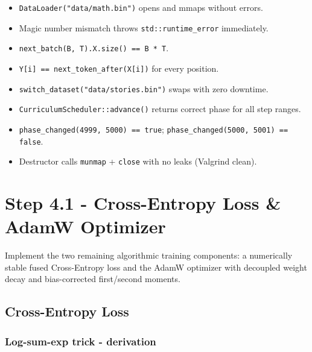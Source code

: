 \documentclass[12pt, a4paper]{article}
\begin{document}
\begin{tcolorbox}[exitbox, title={Steps 3.2 \& 3.3 - Exit Criterion (met)}]
  \begin{itemize}
    \item \texttt{DataLoader("data/math.bin")} opens and mmaps without errors. \checkmark
    \item Magic number mismatch throws \texttt{std::runtime\_error} immediately. \checkmark
    \item \texttt{next\_batch(B, T).X.size() == B * T}. \checkmark
    \item \texttt{Y[i] == next\_token\_after(X[i])} for every position. \checkmark
    \item \texttt{switch\_dataset("data/stories.bin")} swaps with zero downtime. \checkmark
    \item \texttt{CurriculumScheduler::advance()} returns correct phase for all step ranges. \checkmark
    \item \texttt{phase\_changed(4999, 5000) == true}; \texttt{phase\_changed(5000, 5001) == false}. \checkmark
    \item Destructor calls \texttt{munmap} + \texttt{close} with no leaks (Valgrind clean). \checkmark
  \end{itemize}
\end{tcolorbox}

\section{Step 4.1 - Cross-Entropy Loss \& AdamW Optimizer}

\begin{tcolorbox}[designbox, title={Step 4.1 Goal}]
  Implement the two remaining algorithmic training components:
  a numerically stable fused Cross-Entropy loss and the AdamW optimizer
  with decoupled weight decay and bias-corrected first/second moments.
\end{tcolorbox}

\subsection{Cross-Entropy Loss}

\subsubsection{Log-sum-exp trick - derivation}
\end{document}
